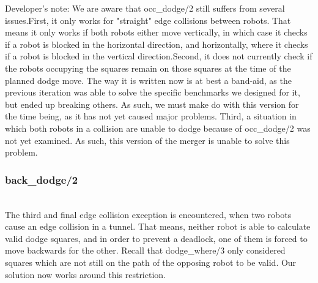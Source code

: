\documentclass{llncs}
\begin{document}
Developer's note: We are aware that occ\_dodge/2 still suffers from several issues.\newline First, it only works for "straight" edge collisions between robots. That means it only works if both robots either move vertically, in which case it checks if a robot is blocked in the horizontal direction, and horizontally, where it checks if a robot is blocked in the vertical direction.\newline Second, it does not currently check if the robots occupying the squares remain on those squares at the time of the planned dodge move. The way it is written now is at best a band-aid, as the previous iteration was able to solve the specific benchmarks we designed for it, but ended up breaking others. As such, we must make do with this version for the time being, as it has not yet caused major problems. \newline Third, a situation in which both robots in a collision are unable to dodge because of occ\_dodge/2 was not yet examined. As such, this version of the merger is unable to solve this problem.


\subsubsection{back\_dodge/2}\hfill\\
The third and final edge collision exception is encountered, when two robots cause an edge collision in a tunnel. That means, neither robot is able to calculate valid dodge squares, and in order to prevent a deadlock, one of them is forced to move backwards for the other. Recall that dodge\_where/3 only considered squares which are not still on the path of the opposing robot to be valid. Our solution now works around this restriction.
\end{document}
